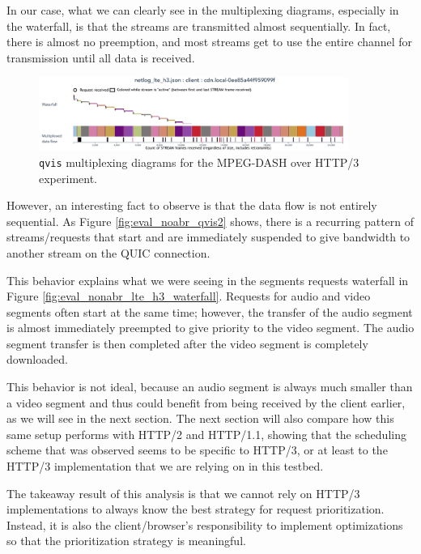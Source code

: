 In our case, what we can clearly see in the multiplexing diagrams, especially in the waterfall, is that the streams are transmitted almost sequentially. In fact, there is almost no preemption, and most streams get to use the entire channel for transmission until all data is received.

\begin{figure}[h]
    \centering
    \includegraphics[width=0.9\textwidth]{res/eval_nonabr_qvis1.png}
    \caption{\texttt{qvis} multiplexing diagrams for the MPEG-DASH over HTTP/3 experiment.}
    \label{fig:eval_noabr_qvis1}
\end{figure}

However, an interesting fact to observe is that the data flow is not entirely sequential. As Figure \ref{fig:eval_noabr_qvis2} shows, there is a recurring pattern of streams/requests that start and are immediately suspended to give bandwidth to another stream on the QUIC connection.

This behavior explains what we were seeing in the segments requests waterfall in Figure \ref{fig:eval_nonabr_lte_h3_waterfall}. Requests for audio and video segments often start at the same time; however, the transfer of the audio segment is almost immediately preempted to give priority to the video segment. The audio segment transfer is then completed after the video segment is completely downloaded.

This behavior is not ideal, because an audio segment is always much smaller than a video segment and thus could benefit from being received by the client earlier, as we will see in the next section. The next section will also compare how this same setup performs with HTTP/2 and HTTP/1.1, showing that the scheduling scheme that was observed seems to be specific to HTTP/3, or at least to the HTTP/3 implementation that we are relying on in this testbed.

The takeaway result of this analysis is that we cannot rely on HTTP/3 implementations to always know the best strategy for request prioritization. Instead, it is also the client/browser's responsibility to implement optimizations so that the prioritization strategy is meaningful.

